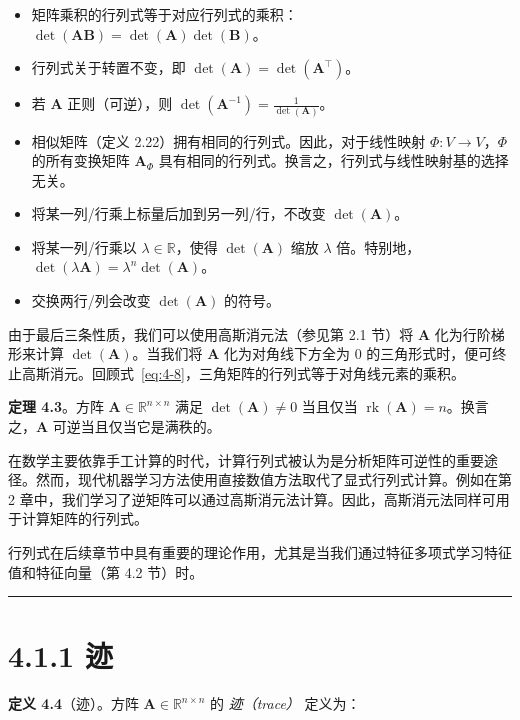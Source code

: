 \begin{itemize}
\item 矩阵乘积的行列式等于对应行列式的乘积：$ \det(\boldsymbol{A} \boldsymbol{B}) = \det(\boldsymbol{A})\det(\boldsymbol{B}) $。
\item 行列式关于转置不变，即 $ \det(\boldsymbol{A}) = \det(\boldsymbol{A}^\top) $。
\item 若 $ \boldsymbol{A} $ 正则（可逆），则 $ \det(\boldsymbol{A}^{-1}) = \frac{1}{\det(\boldsymbol{A})} $。
\item 相似矩阵（定义 2.22）拥有相同的行列式。因此，对于线性映射 $ \Phi : V \to V $，$ \Phi $ 的所有变换矩阵 $ \boldsymbol{A}_\Phi $ 具有相同的行列式。换言之，行列式与线性映射基的选择无关。
\item 将某一列/行乘上标量后加到另一列/行，不改变 $ \det(\boldsymbol{A}) $。
\item 将某一列/行乘以 $ \lambda \in \mathbb{R} $，使得 $ \det(\boldsymbol{A}) $ 缩放 $ \lambda $ 倍。特别地，$ \det(\lambda \boldsymbol{A}) = \lambda^n \det(\boldsymbol{A}) $。
\item 交换两行/列会改变 $ \det(\boldsymbol{A}) $ 的符号。
\end{itemize}

由于最后三条性质，我们可以使用高斯消元法（参见第 2.1 节）将 $ \boldsymbol{A} $ 化为行阶梯形来计算 $ \det(\boldsymbol{A}) $。当我们将 $ \boldsymbol{A} $ 化为对角线下方全为 0 的三角形式时，便可终止高斯消元。回顾式~\eqref{eq:4-8}，三角矩阵的行列式等于对角线元素的乘积。

\textbf{定理 4.3}。方阵 $ \boldsymbol{A} \in \mathbb{R}^{n \times n} $ 满足 $ \det(\boldsymbol{A}) \neq 0 $ 当且仅当 $ \operatorname{rk}(\boldsymbol{A}) = n $。换言之，$ \boldsymbol{A} $ 可逆当且仅当它是满秩的。

在数学主要依靠手工计算的时代，计算行列式被认为是分析矩阵可逆性的重要途径。然而，现代机器学习方法使用直接数值方法取代了显式行列式计算。例如在第 2 章中，我们学习了逆矩阵可以通过高斯消元法计算。因此，高斯消元法同样可用于计算矩阵的行列式。

行列式在后续章节中具有重要的理论作用，尤其是当我们通过特征多项式学习特征值和特征向量（第 4.2 节）时。

\medskip\hrule\medskip

\section*{4.1.1 迹}

\textbf{定义 4.4}（迹）。方阵 $ \boldsymbol{A} \in \mathbb{R}^{n \times n} $ 的 \emph{迹（trace）} 定义为：

